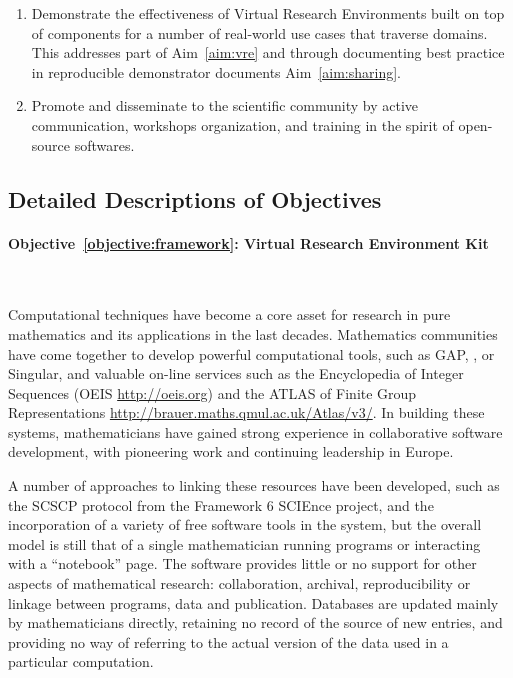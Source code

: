 \documentclass[noworkareas,deliverables,\classoptions]{euproposal}       %
\begin{document}
\begin{proposal}
\begin{enumerate}
\item \label{objective:demo}Demonstrate the effectiveness of Virtual
  Research Environments built on top of \TheProject components for a
  number of real-world use cases that traverse domains. This addresses
  part of Aim~\ref{aim:vre} and through documenting best practice in
  reproducible demonstrator documents Aim~\ref{aim:sharing}.

\item \label{objective:disseminate} Promote and disseminate \TheProject
to the scientific community by active communication, workshops organization,
and training in the spirit of open-source softwares.


\end{enumerate}

\subsection*{Detailed Descriptions of Objectives} %

\paragraph{Objective~\ref{objective:framework}: Virtual Research
  Environment Kit}\ 

Computational techniques have become a core asset for research in pure
mathematics and its applications in the last decades. Mathematics
communities have come together to develop powerful computational
tools, such as GAP, \PariGP, \Sage or Singular, and valuable on-line
services such as the Encyclopedia of Integer Sequences (OEIS
\url{http://oeis.org}) and the ATLAS of Finite Group Representations
\url{http://brauer.maths.qmul.ac.uk/Atlas/v3/}. In building these
systems, mathematicians have gained strong experience in collaborative
software development, with pioneering work and continuing leadership
in Europe.

A number of approaches to linking these resources have been developed,
such as the SCSCP protocol from the Framework 6 SCIEnce project, and
the incorporation of a variety of free software tools in the \Sage 
system, but the overall model is still that of a single mathematician
running programs or interacting with a ``notebook''
page. The software provides little or no support for other aspects of
mathematical research: collaboration,
archival, reproducibility or linkage between programs, data and
publication. Databases are updated mainly by mathematicians directly,
retaining no record of the source of new entries, and providing no way
of referring to the actual version of the data used in a particular
computation.


\end{proposal}
\end{document}
